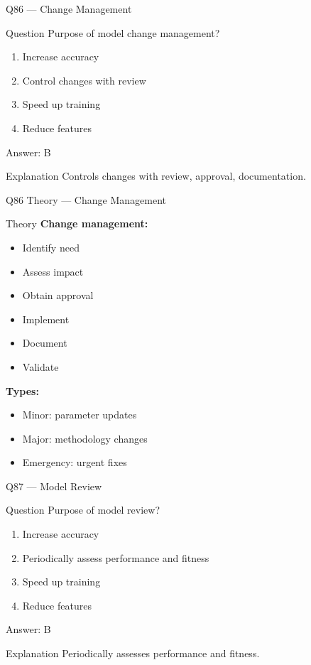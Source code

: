 \documentclass[aspectratio=169,8pt]{beamer}
\begin{document}
	\begin{frame}{Q86 --- Change Management}
		\begin{block}{Question}
			Purpose of model change management?
		\end{block}
		\begin{enumerate}[label=\Alph*.]
			\item Increase accuracy
			\item Control changes with review
			\item Speed up training
			\item Reduce features
		\end{enumerate}
		\begin{exampleblock}{Answer: B}
		\end{exampleblock}
		\begin{block}{Explanation}
			Controls changes with review, approval, documentation.
		\end{block}
	\end{frame}
	
	\begin{frame}{Q86 Theory --- Change Management}
		\begin{block}{Theory}
			\textbf{Change management:}
			\begin{itemize}
				\item Identify need
				\item Assess impact
				\item Obtain approval
				\item Implement
				\item Document
				\item Validate
			\end{itemize}
			\textbf{Types:}
			\begin{itemize}
				\item Minor: parameter updates
				\item Major: methodology changes
				\item Emergency: urgent fixes
			\end{itemize}
		\end{block}
	\end{frame}
	
	\begin{frame}{Q87 --- Model Review}
		\begin{block}{Question}
			Purpose of model review?
		\end{block}
		\begin{enumerate}[label=\Alph*.]
			\item Increase accuracy
			\item Periodically assess performance and fitness
			\item Speed up training
			\item Reduce features
		\end{enumerate}
		\begin{exampleblock}{Answer: B}
		\end{exampleblock}
		\begin{block}{Explanation}
			Periodically assesses performance and fitness.
		\end{block}
	\end{frame}
	
\end{document}
